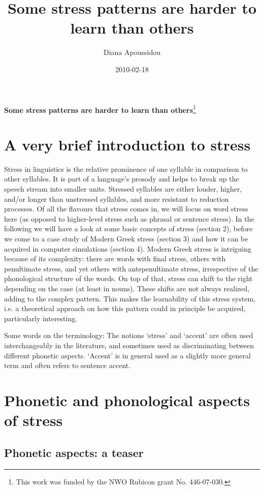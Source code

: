 \documentclass[a4paper]{article}
\title{Some stress patterns are harder to learn than others }
\author{Diana Apoussidou}
\date{2010-02-18}
\begin{document}
{\centering
\textbf{Some stress patterns are harder to learn than others}\footnote{ This work was funded by the NWO Rubicon grant No. 446-07-030.}
\par}


\section{
A very brief introduction to stress}


Stress in linguistics is the relative prominence of one syllable in comparison to other syllables. It is part of a language’s prosody and helps to break up the speech stream into smaller units. Stressed syllables are either louder, higher, and/or longer than unstressed syllables, and more resistant to reduction processes. Of all the flavours that stress comes in, we will focus on word stress here (as opposed to higher-level stress such as phrasal or sentence stress). In the following we will have a look at some basic concepts of stress (section 2), before we come to a case study of Modern Greek stress (section 3) and how it can be acquired in computer simulations (section 4). Modern Greek stress is intriguing because of its complexity: there are words with final stress, others with penultimate stress, and yet others with antepenultimate stress, irrespective of the phonological structure of the words. On top of that, stress can shift to the right depending on the case (at least in nouns). These shifts are not always realized, adding to the complex pattern. This makes the learnability of this stress system, i.e. a theoretical approach on how this pattern could in principle be acquired, particularly interesting.

Some words on the terminology: The notions ‘stress’ and ‘accent’ are often used interchangeably in the literature, and sometimes used as discriminating between different phonetic aspects. ‘Accent’ is in general used as a slightly more general term and often refers to sentence accent.


\section{
Phonetic and phonological aspects of stress}


\subsection{
Phonetic aspects: a teaser}
\end{document}
